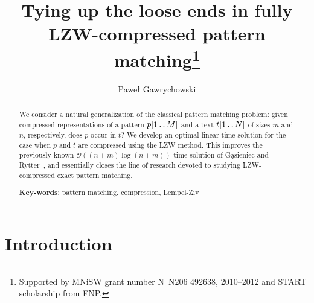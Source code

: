 \documentclass[runningheads]{llncs}
\newcommand{\twodots}{\mathinner{\ldotp\ldotp}}
\begin{document}
\title{Tying up the loose ends in fully LZW-compressed pattern matching\thanks{Supported by MNiSW grant number N~N206 492638, 2010--2012 and START scholarship from FNP.}}

\author{Pawe\l{} Gawrychowski}

\maketitle

\begin{abstract}
We consider a natural generalization of the classical pattern matching problem: given compressed representations of a pattern $p[1\twodots M]$ and a 
text $t[1\twodots N]$ of sizes $m$ and $n$, respectively, does $p$ occur in $t$? We develop an optimal linear time solution for the case when $p$ and $t$ are compressed using the LZW method. This improves the previously known $\mathcal{O}((n+m)\log(n+m))$ time solution of G\k{a}sieniec and Rytter~\cite{RytterGasieniec}, and essentially closes the line of research devoted to studying LZW-compressed exact pattern matching.

\textbf{Key-words}: pattern matching, compression, Lempel-Ziv
\end{abstract}

\section{Introduction}
\end{document}
